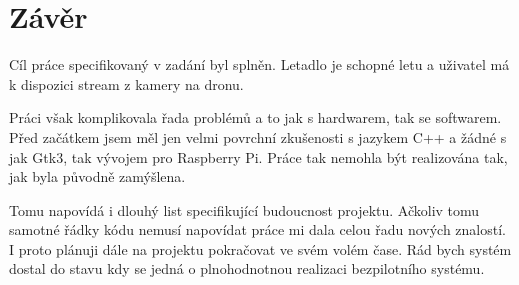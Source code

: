 \chapter*{Závěr}

Cíl práce specifikovaný v zadání byl splněn.
Letadlo je schopné letu a uživatel má k dispozici stream z kamery na dronu.

Práci však komplikovala řada problémů a to jak s hardwarem, tak se softwarem.
Před začátkem jsem měl jen velmi povrchní zkušenosti s jazykem C++ a žádné s jak Gtk3, tak vývojem pro Raspberry Pi.
Práce tak nemohla být realizována tak, jak byla původně zamýšlena.

Tomu napovídá i dlouhý list specifikující budoucnost projektu.
Ačkoliv tomu samotné řádky kódu nemusí napovídat práce mi dala celou řadu nových znalostí.
I proto plánuji dále na projektu pokračovat ve svém volém čase.
Rád bych systém dostal do stavu kdy se jedná o plnohodnotnou realizaci bezpilotního systému.


